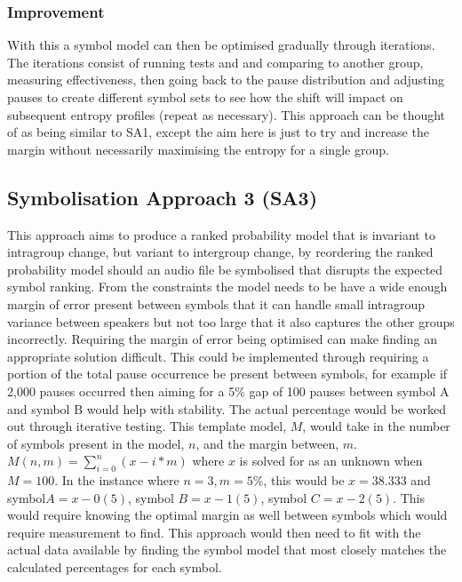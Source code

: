 \subsubsection{Improvement}
With this a symbol model can then be optimised gradually through iterations. The iterations consist of running tests and and comparing to another group, measuring effectiveness, then going back to the pause distribution and adjusting pauses to create different symbol sets to see how the shift will impact on subsequent entropy profiles (repeat as necessary). This approach can be thought of as being similar to SA1, except the aim here is just to try and increase the margin without necessarily maximising the entropy for a single group.



\subsection{Symbolisation Approach 3 (SA3)}
This approach aims to produce a ranked probability model that is invariant to intragroup change, but variant to intergroup change, by reordering the ranked probability model should an audio file be symbolised that disrupts the expected symbol ranking. From the constraints the model needs to be have a wide enough margin of error present between symbols that it can handle small intragroup variance between speakers but not too large that it also captures the other groups incorrectly. Requiring the margin of error being optimised can make finding an appropriate solution difficult. This could be implemented through requiring a portion of the total pause occurrence be present between symbols, for example if 2,000 pauses occurred then aiming for a 5\% gap of 100 pauses between symbol A and symbol B would help with stability. The actual percentage would be worked out through iterative testing. This template model, $M$, would take in the number of symbols present in the model, $n$, and the margin between, $m$. $M(n, m) = \sum_{i=0}^n (x - i*m)$ where $x$ is solved for as an unknown when $ M = 100$. In the instance where $n = 3, m = 5\%$, this would be $x = 38.333$ and symbol$ A = x - 0(5)$, symbol $B = x - 1(5)$, symbol $C = x - 2(5)$. This would require knowing the optimal margin as well between symbols which would require measurement to find. This approach would then need to fit with the actual data available by finding the symbol model that most closely matches the calculated percentages for each symbol.

